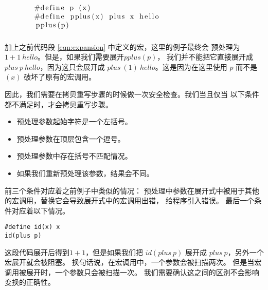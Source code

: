 \begin{equation}\label{eqn:expandToParentheses}
  \begin{minipage}{0.8\columnwidth}
\begin{lstlisting}
#define p (x)
#define pplus(x) plus x hello
pplus(p)  
\end{lstlisting}
    \end{minipage}
\end{equation}

加上之前代码段 \ref{eqn:expansion} 中定义的宏，这里的例子最终会
预处理为$1+1\ hello$。但是，如果我们需要展开$pplus(p)$，
我们并不能把它直接展开成$plus\ p\ hello$，因为这只会展开成
$plus\ (1)\ hello$。这是因为在这里使用 $p$ 而不是 $(x)$ 
破坏了原有的宏调用。


因此，我们需要在拷贝重写步骤的时候做一次安全检查。我们当且仅当
以下条件都不满足时，才会拷贝重写步骤。

\begin{itemize}
\item 预处理参数起始字符是一个左括号。
\item 预处理参数在顶层包含一个逗号。
\item 预处理参数中存在括号不匹配情况。
\item 如果我们重新预处理该参数，结果会不同。
\end{itemize}
前三个条件对应着之前例子中类似的情况：
预处理中参数在展开式中被用于其他的宏调用，替换它会导致展开式中的宏调用出错，
给程序引入错误。
最后一个条件对应着以下情况。
\begin{lstlisting}
#define id(x) x
id(plus p)
\end{lstlisting}
这段代码展开后得到$1+1$，但是如果我们把 $id(plus\ p)$
展开成  $plus\ p$，另外一个宏展开就会被阻塞。
换句话说，在宏调用中，一个参数会被扫描两次。
但是当宏调用被展开时，一个参数只会被扫描一次。
我们需要确认这之间的区别不会影响变换的正确性。

